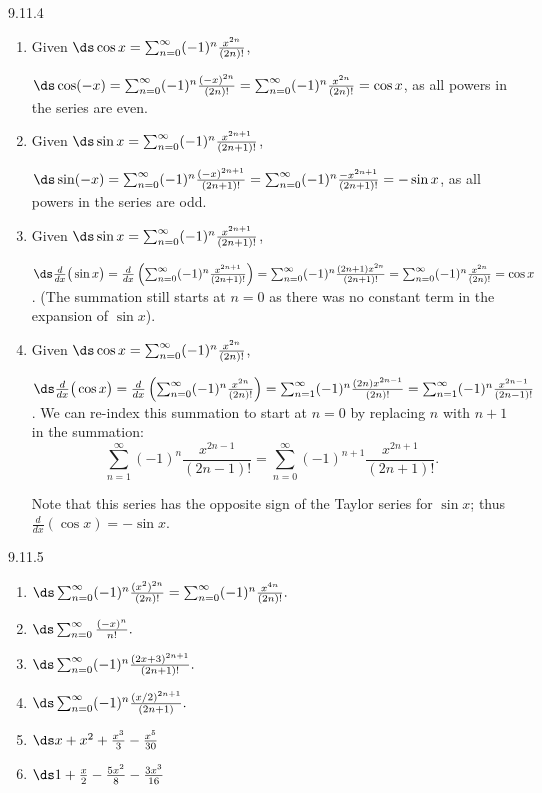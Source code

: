\begin{Answer}{9.11.4}
\begin{enumerate}
\item
{Given $\ds \cos x = \sum_{n=0}^\infty (-1)^n\frac{x^{2n}}{(2n)!}$,

$\ds\cos (-x) = \sum_{n=0}^\infty (-1)^n\frac{(-x)^{2n}}{(2n)!}=\sum_{n=0}^\infty (-1)^n\frac{x^{2n}}{(2n)!}=\cos x$, as all powers in the series are even.
}
\item
{Given $\ds \sin x = \sum_{n=0}^\infty (-1)^n\frac{x^{2n+1}}{(2n+1)!}$,

$\ds\sin (-x) = \sum_{n=0}^\infty (-1)^n\frac{(-x)^{2n+1}}{(2n+1)!}=\sum_{n=0}^\infty (-1)^n\frac{-x^{2n+1}}{(2n+1)!}=-\sin x$, as all powers in the series are odd.
}
\item
{Given $\ds \sin x = \sum_{n=0}^\infty (-1)^n\frac{x^{2n+1}}{(2n+1)!}$,

$\ds\frac{d}{dx}\big(\sin x\big)  = \frac{d}{dx}\left(\sum_{n=0}^\infty (-1)^n\frac{x^{2n+1}}{(2n+1)!}\right)=\sum_{n=0}^\infty (-1)^n\frac{(2n+1)x^{2n}}{(2n+1)!}=\sum_{n=0}^\infty (-1)^n\frac{x^{2n}}{(2n)!}=\cos x$. (The summation still starts at $n=0$ as there was no constant term in the expansion of $\sin x$).
}
\item
{Given $\ds \cos x = \sum_{n=0}^\infty (-1)^n\frac{x^{2n}}{(2n)!}$,

$\ds\frac{d}{dx}\big(\cos x\big)  = \frac{d}{dx}\left(\sum_{n=0}^\infty (-1)^n\frac{x^{2n}}{(2n)!}\right)=\sum_{n=1}^\infty (-1)^n\frac{(2n)x^{2n-1}}{(2n)!}=\sum_{n=1}^\infty (-1)^n\frac{x^{2n-1}}{(2n-1)!}$. We can re-index this summation to start at $n=0$ by replacing $n$ with $n+1$ in the summation:
$$ \sum_{n=1}^\infty (-1)^n\frac{x^{2n-1}}{(2n-1)!} =\sum_{n=0}^\infty (-1)^{n+1}\frac{x^{2n+1}}{(2n+1)!}.$$

Note that this series has the opposite sign of the Taylor series for $\sin x$; thus $\frac{d}{dx}(\cos x) = -\sin x$.
}
\end{enumerate}
\end{Answer}
\begin{Answer}{9.11.5}
\begin{enumerate}
\item
{$\ds \sum_{n=0}^\infty (-1)^n\frac{(x^2)^{2n}}{(2n)!} = \sum_{n=0}^\infty (-1)^n\frac{x^{4n}}{(2n)!}.$
}
\item
{$\ds \sum_{n=0}^\infty \frac{(-x)^n}{n!}.$
}
\item
{$\ds \sum_{n=0}^\infty (-1)^n\frac{(2x+3)^{2n+1}}{(2n+1)!}.$
}
\item
{$\ds \sum_{n=0}^\infty (-1)^n\frac{(x/2)^{2n+1}}{(2n+1)}.$
}
\item
{$\ds x+x^2+\frac{x^3}{3}-\frac{x^5}{30}$
}
\item
{$\ds 1+\frac x2-\frac{5x^2}{8}-\frac{3x^3}{16}$
}
\end{enumerate}
\end{Answer}
